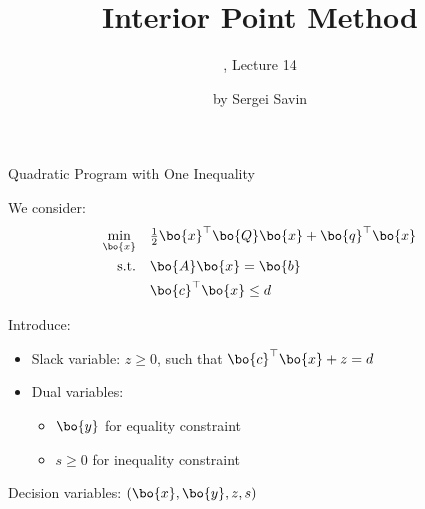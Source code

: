\documentclass{beamer}
\title{Interior Point Method}
\subtitle{\mycoursetitle, Lecture 14}
\author{by Sergei Savin}
\date{\mydate}
\begin{document}
\maketitle


%
%



\begin{frame}{Quadratic Program with One Inequality}
	\begin{flushleft}
		
		We consider:
		\begin{align*}
			\min_{\bo{x}} \quad & \tfrac{1}{2} \bo{x}^\top \bo{Q} \bo{x} + \bo{q}^\top \bo{x} \\
			\text{s.t.} \quad & \bo{A}\bo{x} = \bo{b} \\
			& \bo{c}^\top \bo{x} \le d
		\end{align*}
		
		\vspace{0.5em}
		
		Introduce:
		\begin{itemize}
			\item Slack variable: $z \ge 0$, such that $\bo{c}^\top \bo{x} + z = d$
			\item Dual variables:
			\begin{itemize}
				\item $\bo{y}$ for equality constraint
				\item $s \ge 0$ for inequality constraint
			\end{itemize}
		\end{itemize}
		
		\vspace{0.5em}
		
		Decision variables: $(\bo{x}, \bo{y}, z, s)$
		
	\end{flushleft}
\end{frame}
\end{document}
